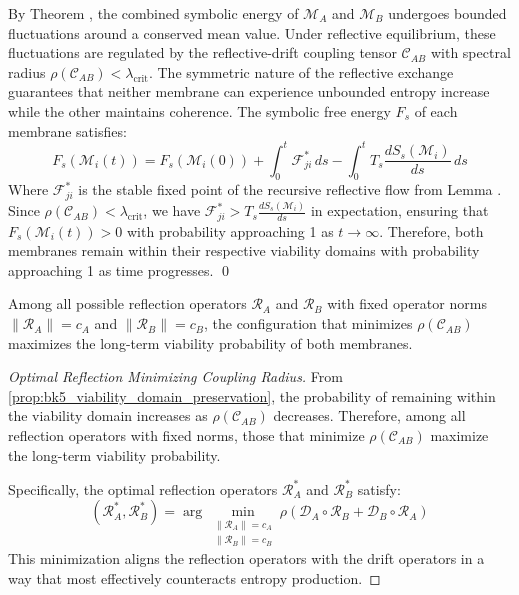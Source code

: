 \begin{demonstratio}
\label{demonstratio:bk5_energy_fluctuation_bound}
By Theorem , the combined symbolic energy of $\mathscr{M}_A$ and $\mathscr{M}_B$ undergoes bounded fluctuations around a conserved mean value. Under reflective equilibrium, these fluctuations are regulated by the reflective-drift coupling tensor $\mathcal{C}_{AB}$ with spectral radius $\rho(\mathcal{C}_{AB}) < \lambda_{\text{crit}}$.
The symmetric nature of the reflective exchange guarantees that neither membrane can experience unbounded entropy increase while the other maintains coherence. The symbolic free energy $F_s$ of each membrane satisfies:
\begin{equation}
F_s(\mathscr{M}_i(t)) = F_s(\mathscr{M}_i(0)) + \int_0^t \mathcal{F}_{ji}^*\,ds - \int_0^t T_s\frac{dS_s(\mathscr{M}_i)}{ds}\,ds
\end{equation}
Where $\mathcal{F}_{ji}^*$ is the stable fixed point of the recursive reflective flow from Lemma .
Since $\rho(\mathcal{C}_{AB}) < \lambda_{\text{crit}}$, we have $\mathcal{F}_{ji}^* > T_s\frac{dS_s(\mathscr{M}_i)}{ds}$ in expectation, ensuring that $F_s(\mathscr{M}_i(t)) > 0$ with probability approaching 1 as $t \to \infty$.
Therefore, both membranes remain within their respective viability domains with probability approaching 1 as time progresses. \qed
\end{demonstratio}
\begin{corollary} \label{corollary:bk5_spectral_radius_optimality}

Among all possible reflection operators $\mathscr{R}_A$ and $\mathscr{R}_B$ with fixed operator norms $\|\mathscr{R}_A\| = c_A$ and $\|\mathscr{R}_B\| = c_B$, the configuration that minimizes $\rho(\mathcal{C}_{AB})$ maximizes the long-term viability probability of both membranes.
\end{corollary}
\begin{proof}[Optimal Reflection Minimizing Coupling Radius]
\label{proof:bk5_optimal_reflection_minimizing_coupling_radius}
From \autoref{prop:bk5_viability_domain_preservation}, the probability of remaining within the viability domain increases as $\rho(\mathcal{C}_{AB})$ decreases. Therefore, among all reflection operators with fixed norms, those that minimize $\rho(\mathcal{C}_{AB})$ maximize the long-term viability probability.

Specifically, the optimal reflection operators $\mathscr{R}_A^*$ and $\mathscr{R}_B^*$ satisfy:
\begin{equation}
(\mathscr{R}_A^*, \mathscr{R}_B^*) = \arg\min_{\substack{\|\mathscr{R}_A\| = c_A \\ \|\mathscr{R}_B\| = c_B}} \rho(\mathscr{D}_A \circ \mathscr{R}_B + \mathscr{D}_B \circ \mathscr{R}_A)
\end{equation}
This minimization aligns the reflection operators with the drift operators in a way that most effectively counteracts entropy production.
\end{proof}

